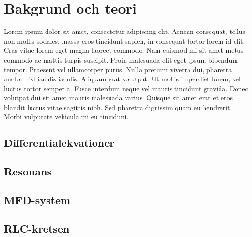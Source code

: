 \documentclass[11pt,a4paper]{article}
\begin{document}
\newpage

\section{Bakgrund och teori}
Lorem ipsum dolor sit amet, consectetur adipiscing elit. Aenean
consequat, tellus non mollis sodales, massa eros tincidunt sapien, in
consequat tortor lorem id elit. Cras vitae lorem eget magna laoreet
commodo. Nam euismod mi sit amet metus commodo ac mattis turpis
suscipit. Proin malesuada elit eget ipsum bibendum tempor. Praesent
vel ullamcorper purus. Nulla pretium viverra dui, pharetra auctor nisl
iaculis iaculis. Aliquam erat volutpat. Ut mollis imperdiet lorem, vel
luctus tortor semper a. Fusce interdum neque vel mauris tincidunt
gravida. Donec volutpat dui sit amet mauris malesuada varius. Quisque
sit amet erat et eros blandit luctus vitae sagittis nibh. Sed pharetra
dignissim quam eu hendrerit. Morbi vulputate vehicula mi eu tincidunt.
\subsection{Differentialekvationer}
\subsection{Resonans}
\subsection{MFD-system}
\subsection{RLC-kretsen}
\end{document}
